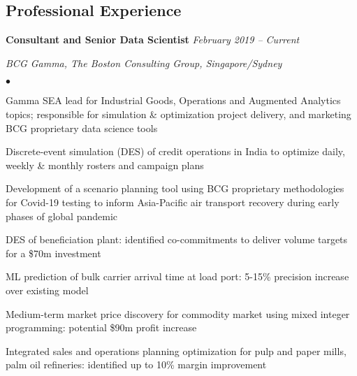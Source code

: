 \documentclass[margin,line]{resume}
\newenvironment{list1}{
  \begin{list}{}{%
      \setlength{\itemsep}{0in}
      \setlength{\parsep}{0in} \setlength{\parskip}{0in}
      \setlength{\topsep}{0in} \setlength{\partopsep}{0in}
      \setlength{\leftmargin}{0.17in}}}{\end{list}}
\newenvironment{list2}{
  \begin{list}{$\bullet$}{%
      \setlength{\itemsep}{0in}
      \setlength{\parsep}{0in} \setlength{\parskip}{0in}
      \setlength{\topsep}{0in} \setlength{\partopsep}{0in}
      \setlength{\leftmargin}{0.2in}}}{\end{list}}
\begin{document}
\begin{resume}
\section{\sc Professional Experience}
{\textbf{Consultant and Senior Data Scientist}} \hfill {\it February 2019 -- Current}\\
\vspace{-0.85\baselineskip}
\begin{list1}
\item {\it BCG Gamma, The Boston Consulting Group, Singapore/Sydney}
\begin{list2}
\item Gamma SEA lead for Industrial Goods, Operations and Augmented Analytics topics; responsible for simulation \& optimization project delivery, and marketing BCG proprietary data science tools
\item Discrete-event simulation (DES) of credit operations in India to optimize daily, weekly \& monthly rosters and campaign plans
\item Development of a scenario planning tool using BCG proprietary methodologies for Covid-19 testing to inform Asia-Pacific air transport recovery during early phases of global pandemic
\item DES of beneficiation plant: identified co-commitments to deliver volume targets for a \$70m investment 
\item ML prediction of bulk carrier arrival time at load port: 5-15\% precision increase over existing model
\item Medium-term market price discovery for commodity market using mixed integer programming: potential \$90m profit increase
\item Integrated sales and operations planning optimization for pulp and paper mills, palm oil refineries: identified up to 10\% margin improvement 
\end{list2}
\end{list1}


\end{resume}
\end{document}
